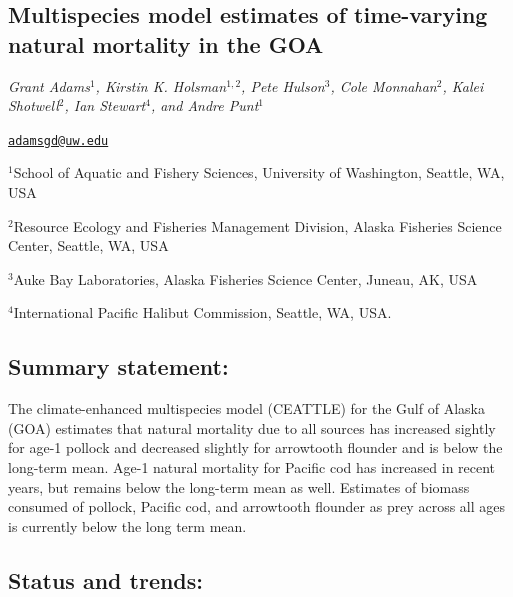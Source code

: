 \documentclass[
]{article}
\author{}
\date{\vspace{-2.5em}}
\begin{document}
\hypertarget{multispecies-model-estimates-of-time-varying-natural-mortality-in-the-goa}{%
\subsection{Multispecies model estimates of time-varying natural
mortality in the
GOA}\label{multispecies-model-estimates-of-time-varying-natural-mortality-in-the-goa}}

\emph{Grant Adams\(^1\), Kirstin K. Holsman\(^{1,2}\), Pete
Hulson\(^3\), Cole Monnahan\(^2\), Kalei Shotwell\(^2\), Ian
Stewart\(^4\), and Andre Punt\(^1\)}

\href{mailto:adamsgd@uw.edu}{\nolinkurl{adamsgd@uw.edu}}

\(^1\)School of Aquatic and Fishery Sciences, University of Washington,
Seattle, WA, USA

\(^2\)Resource Ecology and Fisheries Management Division, Alaska
Fisheries Science Center, Seattle, WA, USA

\(^3\)Auke Bay Laboratories, Alaska Fisheries Science Center, Juneau,
AK, USA

\(^4\)International Pacific Halibut Commission, Seattle, WA, USA.

\hypertarget{summary-statement}{%
\subsection{Summary statement:}\label{summary-statement}}

The climate-enhanced multispecies model (CEATTLE) for the Gulf of Alaska
(GOA) estimates that natural mortality due to all sources has increased
sightly for age-1 pollock and decreased slightly for arrowtooth flounder
and is below the long-term mean. Age-1 natural mortality for Pacific cod
has increased in recent years, but remains below the long-term mean as
well. Estimates of biomass consumed of pollock, Pacific cod, and
arrowtooth flounder as prey across all ages is currently below the long
term mean.

\hypertarget{status-and-trends}{%
\subsection{Status and trends:}\label{status-and-trends}}
\end{document}
